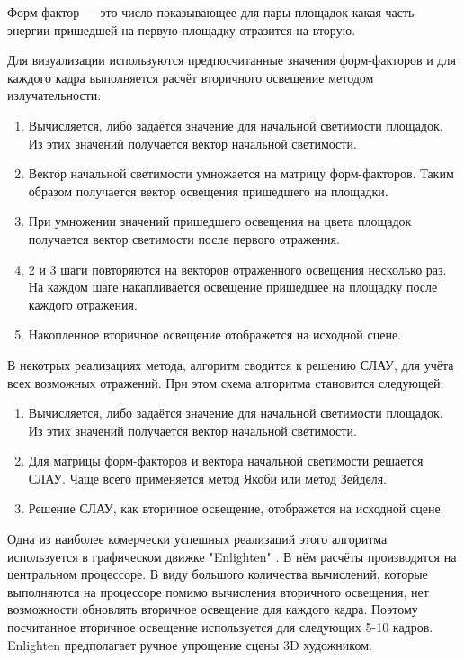 \documentclass[12pt,fleqn]{article}
\begin{document}
Форм-фактор --- это число показывающее для пары площадок какая часть энергии пришедшей на первую площадку отразится на вторую.

Для визуализации используются предпосчитанные значения форм-факторов и для каждого кадра выполняется расчёт вторичного освещение методом излучательности:

\begin{enumerate}

\item Вычисляется, либо задаётся значение для начальной светимости площадок. Из этих значений получается вектор начальной светимости.

\item Вектор начальной светимости умножается на матрицу форм-факторов. Таким образом получается вектор освещения пришедшего на площадки.

\item При умножении значений пришедшего освещения на цвета площадок получается вектор светимости после первого отражения.

\item 2 и 3 шаги повторяются на векторов отраженного освещения несколько раз. На каждом шаге накапливается освещение пришедшее на площадку после каждого отражения.

\item Накопленное вторичное освещение отображется на исходной сцене.

\end{enumerate}

В некотрых реализациях метода, алгоритм сводится к решению СЛАУ, для учёта всех возможных отражений. При этом схема алгоритма становится следующей: 

\begin{enumerate}

\item Вычисляется, либо задаётся значение для начальной светимости площадок. Из этих значений получается вектор начальной светимости.

\item Для матрицы форм-факторов и вектора начальной светимости решается СЛАУ. Чаще всего применяется метод Якоби или метод Зейделя.

\item Решение СЛАУ, как вторичное освещение, отображется на исходной сцене.

\end{enumerate}

Одна из наиболее комерчески успешных реализаций этого алгоритма используется в графическом движке "Enlighten" \cite{Enlighten}. В нём расчёты производятся на центральном процессоре. В виду большого количества вычислений, которые выполняются на процессоре помимо вычисления вторичного освещения, нет возможности обновлять вторичное освещение для каждого кадра. Поэтому посчитанное вторичное освещение используется для следующих 5-10 кадров. Enlighten предполагает ручное упрощение сцены 3D художником.
\end{document}
